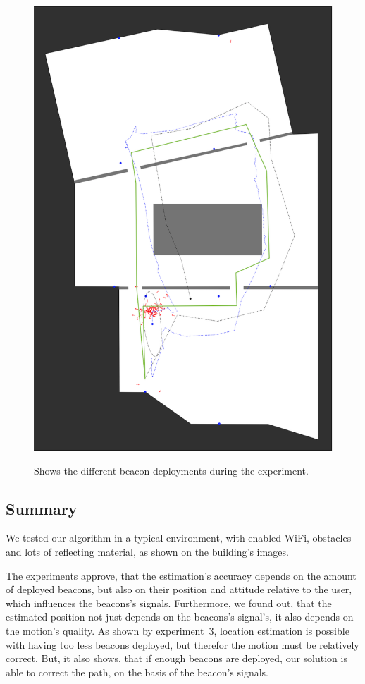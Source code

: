 \begin{figure}
{		\includegraphics[height=0.45\textheight]{figures/eval_3_6}
		\label{fig:exp2_imgs_6}
	}
	\caption{Shows the different beacon deployments during the experiment.}
\end{figure}


\subsection*{Summary}
We tested our algorithm in a typical environment, with enabled WiFi, obstacles and lots of reflecting material, as shown on the building's images.

The experiments approve, that the estimation's accuracy depends on the amount of deployed beacons, but also on their position and attitude relative to the user, which influences the beacons's signals. Furthermore, we found out, that the estimated position not just depends on the beacons's signal's, it also depends on the motion's quality. As shown by experiment~3, location estimation is possible with having too less beacons deployed, but therefor the motion must be relatively correct. But, it also shows, that if enough beacons are deployed, our solution is able to correct the path, on the basis of the beacon's signals.

